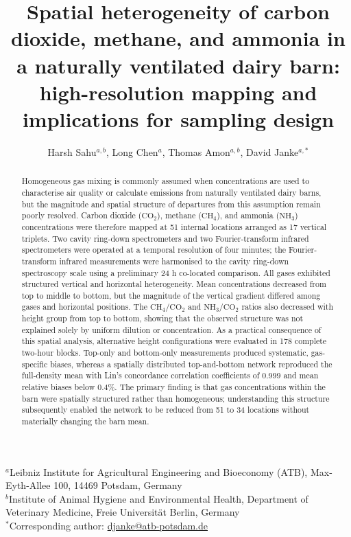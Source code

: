 \documentclass[12pt,a4paper]{article}
\title{Spatial heterogeneity of carbon dioxide, methane, and ammonia in a naturally ventilated dairy barn: high-resolution mapping and implications for sampling design}
\author{
Harsh Sahu$^{a,b}$,
Long Chen$^{a}$,
Thomas Amon$^{a,b}$,
David Janke$^{a,*}$
}
\date{}
\begin{document}
\maketitle

\begin{center}
\small
$^{a}$Leibniz Institute for Agricultural Engineering and Bioeconomy (ATB),
Max-Eyth-Allee 100, 14469 Potsdam, Germany\\
$^{b}$Institute of Animal Hygiene and Environmental Health, Department of
Veterinary Medicine, Freie Universit\"at Berlin, Germany\\
$^{*}$Corresponding author: \href{mailto:djanke@atb-potsdam.de}{djanke@atb-potsdam.de}
\end{center}

\begin{abstract}
Homogeneous gas mixing is commonly assumed when concentrations are used to
characterise air quality or calculate emissions from naturally ventilated
dairy barns, but the magnitude and spatial structure of departures from this
assumption remain poorly resolved. Carbon dioxide (\(\mathrm{CO_2}\)),
methane (\(\mathrm{CH_4}\)), and ammonia (\(\mathrm{NH_3}\)) concentrations
were therefore mapped at 51 internal locations arranged as 17 vertical
triplets. Two cavity ring-down spectrometers and two Fourier-transform infrared
spectrometers were operated at a temporal resolution of four minutes; the
Fourier-transform infrared measurements were harmonised to the cavity
ring-down spectroscopy scale using a preliminary 24 h co-located comparison.
All gases exhibited structured vertical and horizontal heterogeneity. Mean
concentrations decreased from top to middle to bottom, but the magnitude of
the vertical gradient differed among gases and horizontal positions. The
\(\mathrm{CH_4}/\mathrm{CO_2}\) and
\(\mathrm{NH_3}/\mathrm{CO_2}\) ratios also decreased with height group from
top to bottom, showing that the observed structure was not explained solely by
uniform dilution or concentration. As a practical consequence of this spatial
analysis, alternative height configurations were evaluated in 178 complete
two-hour blocks. Top-only and bottom-only measurements produced systematic,
gas-specific biases, whereas a spatially distributed top-and-bottom network
reproduced the full-density mean with Lin's concordance correlation
coefficients of 0.999 and mean relative biases below 0.4\%. The primary finding
is that gas concentrations within the barn were spatially structured rather
than homogeneous; understanding this structure subsequently enabled the
network to be reduced from 51 to 34 locations without materially changing the
barn mean.
\end{abstract}
\end{document}
